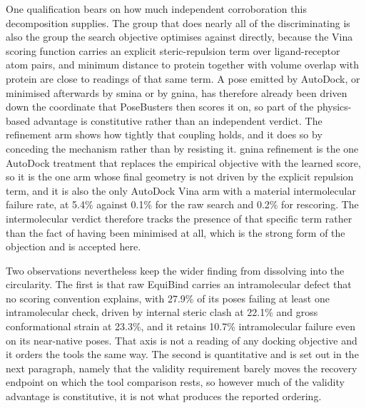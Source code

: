 One qualification bears on how much independent corroboration this decomposition supplies. The group that does nearly all of the discriminating is also the group the search objective optimises against directly, because the Vina scoring function carries an explicit steric-repulsion term over ligand-receptor atom pairs, and minimum distance to protein together with volume overlap with protein are close to readings of that same term. A pose emitted by AutoDock, or minimised afterwards by smina or by gnina, has therefore already been driven down the coordinate that PoseBusters then scores it on, so part of the physics-based advantage is constitutive rather than an independent verdict. The refinement arm shows how tightly that coupling holds, and it does so by conceding the mechanism rather than by resisting it. gnina refinement is the one AutoDock treatment that replaces the empirical objective with the learned score, so it is the one arm whose final geometry is not driven by the explicit repulsion term, and it is also the only AutoDock Vina arm with a material intermolecular failure rate, at 5.4\% against 0.1\% for the raw search and 0.2\% for rescoring. The intermolecular verdict therefore tracks the presence of that specific term rather than the fact of having been minimised at all, which is the strong form of the objection and is accepted here.

Two observations nevertheless keep the wider finding from dissolving into the circularity. The first is that raw EquiBind carries an intramolecular defect that no scoring convention explains, with 27.9\% of its poses failing at least one intramolecular check, driven by internal steric clash at 22.1\% and gross conformational strain at 23.3\%, and it retains 10.7\% intramolecular failure even on its near-native poses. That axis is not a reading of any docking objective and it orders the tools the same way. The second is quantitative and is set out in the next paragraph, namely that the validity requirement barely moves the recovery endpoint on which the tool comparison rests, so however much of the validity advantage is constitutive, it is not what produces the reported ordering.

